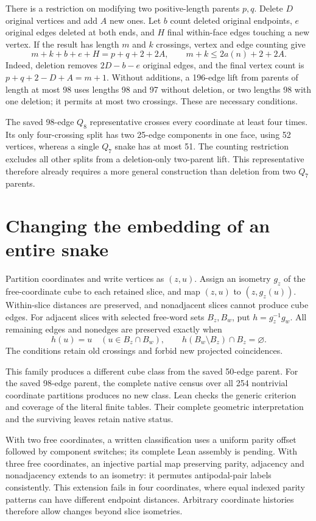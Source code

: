\documentclass[11pt,a4paper]{article}
\begin{document}
There is a restriction on modifying two positive-length parents $p,q$.
Delete $D$ original vertices and add $A$ new ones. Let $b$ count deleted
original endpoints, $e$ original edges deleted at both ends, and $H$ final
within-face edges touching a new vertex. If the result has length $m$
and $k$ crossings, vertex and edge counting give
\[
m+k+b+e+H=p+q+2+2A,\qquad m+k\le2a(n)+2+2A.
\]
Indeed, deletion removes $2D-b-e$ original edges, and the final vertex
count is $p+q+2-D+A=m+1$.
Without additions, a 196-edge lift from parents of length at most 98
uses lengths 98 and 97 without deletion, or two lengths 98 with one
deletion; it permits at most two crossings. These are necessary conditions.

The saved 98-edge $Q_8$ representative crosses every coordinate at least
four times. Its only four-crossing split has two 25-edge components in
one face, using 52 vertices, whereas a single $Q_7$ snake has at most 51.
The counting restriction excludes all other splits from a deletion-only
two-parent lift. This representative therefore already requires a more
general construction than deletion from two $Q_7$ parents.

\section{Changing the embedding of an entire snake}
Partition coordinates and write vertices as $(z,u)$. Assign an isometry
$g_z$ of the free-coordinate cube to each retained slice, and map
$(z,u)$ to $(z,g_z(u))$. Within-slice distances are preserved, and
nonadjacent slices cannot produce cube edges.
For adjacent slices with selected free-word sets $B_z,B_w$, put
$h=g_z^{-1}g_w$. All remaining edges and nonedges are preserved exactly when
\[
h(u)=u\quad(u\in B_z\cap B_w),\qquad
h(B_w\setminus B_z)\cap B_z=\varnothing.
\]
The conditions retain old crossings and forbid new projected coincidences.

This family produces a different cube class from the saved 50-edge parent.
For the saved 98-edge parent, the complete native census over all 254
nontrivial coordinate partitions produces no new class. Lean checks the
generic criterion and coverage of the literal finite tables. Their complete
geometric interpretation and the surviving leaves retain native status.

With two free coordinates, a written classification uses a uniform parity
offset followed by component switches; its complete Lean assembly is pending.
With three free coordinates, an injective partial map preserving parity,
adjacency and nonadjacency extends to an isometry: it permutes antipodal-pair
labels consistently. This extension fails in four coordinates, where equal
indexed parity patterns can have different endpoint distances. Arbitrary
coordinate histories therefore allow changes beyond slice isometries.
\end{document}
